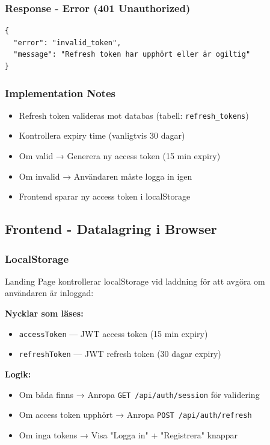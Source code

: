 \documentclass[12pt,a4paper]{article}
\begin{document}
\subsubsection{Response - Error (401 Unauthorized)}
\begin{lstlisting}
{
  "error": "invalid_token",
  "message": "Refresh token har upphört eller är ogiltig"
}
\end{lstlisting}

\subsubsection{Implementation Notes}
\begin{itemize}[noitemsep]
  \item Refresh token valideras mot databas (tabell: \texttt{refresh\_tokens})
  \item Kontrollera expiry time (vanligtvis 30 dagar)
  \item Om valid → Generera ny access token (15 min expiry)
  \item Om invalid → Användaren måste logga in igen
  \item Frontend sparar ny access token i localStorage
\end{itemize}

\subsection{Frontend - Datalagring i Browser}

\subsubsection{LocalStorage}
Landing Page kontrollerar localStorage vid laddning för att avgöra om användaren är inloggad:

\textbf{Nycklar som läses:}
\begin{itemize}[noitemsep]
  \item \texttt{accessToken} — JWT access token (15 min expiry)
  \item \texttt{refreshToken} — JWT refresh token (30 dagar expiry)
\end{itemize}

\textbf{Logik:}
\begin{itemize}[noitemsep]
  \item Om båda finns → Anropa \texttt{GET /api/auth/session} för validering
  \item Om access token upphört → Anropa \texttt{POST /api/auth/refresh}
  \item Om inga tokens → Visa "Logga in" + "Registrera" knappar
\end{itemize}
\end{document}
